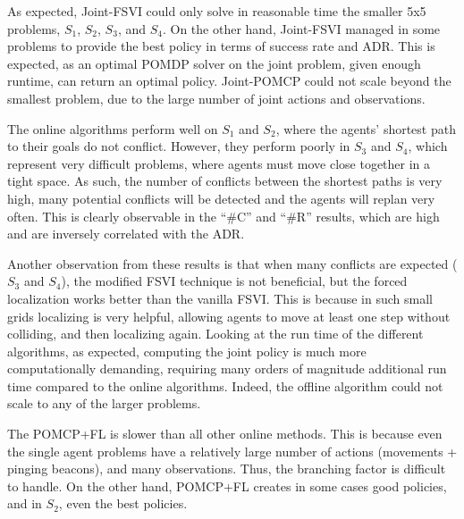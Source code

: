 \documentclass[letterpaper]{article} %
\begin{document}
As expected, Joint-FSVI could only solve in reasonable time the smaller 5x5 problems, $S_1$, $S_2$, $S_3$, and $S_4$. On the other hand, Joint-FSVI managed in some problems to provide the best policy in terms of success rate and ADR. This is expected, as an optimal POMDP solver on the joint problem, given enough runtime, can return an optimal policy. Joint-POMCP could not scale beyond  the smallest problem, due to the large number of joint actions and observations.



The online algorithms perform well on $S_1$ and $S_2$, where the agents' shortest path to their goals do not conflict.
However, they perform poorly in $S_3$ and $S_4$, which represent very difficult problems, where agents must move close together in a tight space. As such, the number of conflicts between the shortest paths is very high, many potential conflicts will be detected and the agents will replan very often. This is clearly observable in the ``\#C'' and ``\#R'' results, which are high and are inversely correlated with the ADR.

Another observation from these results is that when many conflicts are expected ($S_3$ and $S_4$), the modified FSVI technique is not beneficial, but the forced localization works better than the vanilla FSVI.
This is because in such small grids localizing is very helpful, allowing agents to move at least one step without colliding, and then localizing again.
Looking at the run time of the different algorithms, as expected, computing the joint policy is much more computationally demanding, requiring many orders of magnitude additional run time compared to the online algorithms. Indeed, the offline algorithm could not scale to any of the larger problems.

The POMCP+FL is slower than all other online methods. This is because even the single agent problems have a relatively large number of actions (movements + pinging beacons), and many observations. Thus, the branching factor is difficult to handle. On the other hand, POMCP+FL creates in some cases good policies, and in $S_2$, even the best policies.
\end{document}
